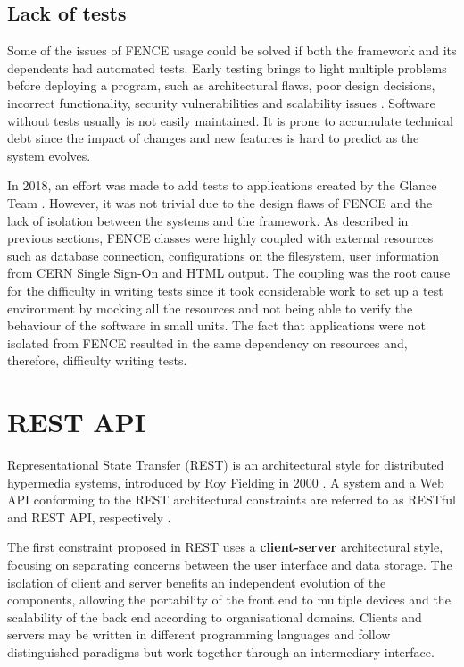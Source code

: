 \subsection{Lack of tests}

Some of the issues of FENCE usage could be solved if both the framework and its dependents had automated tests. Early testing brings to light multiple problems before deploying a program, such as architectural flaws, poor design decisions, incorrect functionality, security vulnerabilities and scalability issues \cite{ibm-software-testing}. Software without tests usually is not easily maintained. It is prone to accumulate technical debt since the impact of changes and new features is hard to predict as the system evolves.

In 2018, an effort was made to add tests to applications created by the Glance Team \cite{alves-tcc}. However, it was not trivial due to the design flaws of FENCE and the lack of isolation between the systems and the framework. As described in previous sections, FENCE classes were highly coupled with external resources such as database connection, configurations on the filesystem, user information from CERN Single Sign-On and HTML output. The coupling was the root cause for the difficulty in writing tests since it took considerable work to set up a test environment by mocking all the resources and not being able to verify the behaviour of the software in small units. The fact that applications were not isolated from FENCE resulted in the same dependency on resources and, therefore, difficulty writing tests.

\section{REST API}

Representational State Transfer (REST) is an architectural style for distributed hypermedia systems, introduced by Roy Fielding in 2000 \cite{fielding-rest}. A system and a Web API  conforming to the  REST architectural constraints are referred to as RESTful and REST API, respectively \cite{restfulapi-site}.

The first constraint proposed in REST uses a \textbf{client-server} architectural style, focusing on separating concerns between the user interface and data storage. The isolation of client and server benefits an independent evolution of the components, allowing the portability of the front end to multiple devices and the scalability of the back end according to organisational domains. Clients and servers may be written in different programming languages and follow distinguished paradigms but work together through an intermediary interface.

